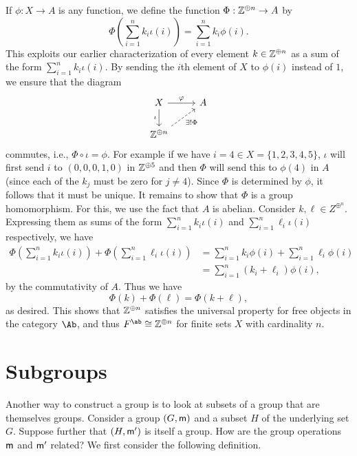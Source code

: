 If \(\phi: X \to A\) is any function, we define the function \(\Phi: \mathbb{Z}^{\oplus
n} \to A\) by
\[
    \Phi\left(\sum_{i = 1}^n k_i \iota(i)\right) = \sum_{i = 1}^n k_i \phi(i).
\]
This exploits our earlier characterization of every element \(k \in \mathbb{Z}^{\oplus
n}\) as a sum of the form \(\sum_{i = 1}^n k_i \iota(i)\). By sending the
\(i\)th element of \(X\) to \(\phi(i)\) instead of \(1\), we ensure that the
diagram
\[
    \begin{tikzcd}
        X \arrow[d, "\iota"'] \arrow[r, "\phi"] & A \\
        \Z^{\oplus n} \arrow[ru, "\exists!\Phi"', dashed] &  
    \end{tikzcd}
\]
commutes, i.e., \(\Phi \circ \iota = \phi\). For example if we have \(i = 4 \in
X = \{1, 2, 3, 4, 5\}\), \(\iota\) will first send \(i\) to \((0, 0, 0, 1, 0)\)
in \(\mathbb{Z}^{\oplus 5}\) and then \(\Phi\) will send this to \(\phi(4)\) in \(A\)
(since each of the \(k_j\) must be zero for \(j \neq 4\)). Since \(\Phi\) is
determined by \(\phi\), it follows that it must be unique. It remains to show
that \(\Phi\) is a group homomorphism. For this, we use the fact that \(A\) is
abelian. Consider \(k, \ell \in Z^{\oplus^n}\). Expressing them as sums of the
form \(\sum_{i = 1}^n k_i \iota(i)\) and \(\sum_{i = 1}^n \ell_i \iota(i)\)
respectively, we have
\begin{align*}
    \Phi\left(\sum_{i = 1}^n k_i \iota(i)\right) + \Phi\left(\sum_{i = 1}^n \ell_i \iota(i)\right) & = \sum_{i = 1}^n k_i \phi(i) + \sum_{i = 1}^n \ell_i \phi(i) \\
    & = \sum_{i = 1}^n (k_i + \ell_i) \phi(i),
\end{align*}
by the commutativity of \(A\). Thus we have
\[
    \Phi(k) + \Phi(\ell) = \Phi(k + \ell),
\]
as desired. This shows that \(\mathbb{Z}^{\oplus n}\) satisfies the universal property
for free objects in the category \(\Ab\), and thus \(F^\ab \cong \Z^{\oplus n}\)
for finite sets \(X\) with cardinality \(n\).

\section{Subgroups}
\label{sec:subgroups}

Another way to construct a group is to look at subsets of a group that are
themselves groups. Consider a group \((G, {\mathsf{m}})\) and a subset \(H\) of the
underlying set \(G\). Suppose further that \((H, {\mathsf{m}}')\) is itself a group.
How are the group operations \({\mathsf{m}}\) and \({\mathsf{m}}'\) related? We first consider
the following definition.

